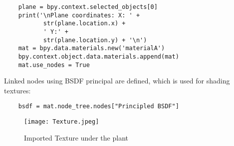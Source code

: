 \documentclass{article}
\begin{document}
\begin{lstlisting}
    plane = bpy.context.selected_objects[0]
    print('\nPlane coordinates: X: ' + 
           str(plane.location.x) + 
           ' Y:' + 
           str(plane.location.y) + '\n')
    mat = bpy.data.materials.new('materialA')
    bpy.context.object.data.materials.append(mat)
    mat.use_nodes = True
\end{lstlisting}

Linked nodes using BSDF principal are defined, which is used for shading textures:
\newline
\begin{lstlisting}
    bsdf = mat.node_tree.nodes["Principled BSDF"]
\end{lstlisting}
\begin{figure}[htp]
\centering
\texttt{[image: Texture.jpeg]}
\caption{Imported Texture under the plant}
\end{figure}
\end{document}
